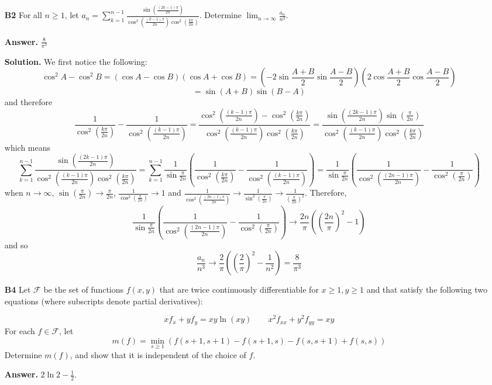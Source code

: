 \documentclass[11pt,a4paper]{article}
\newcommand{\<}{\langle}
\renewcommand{\>}{\rangle}
\begin{document}
\begin{enumerate}
	
	
	\item [\textbf{B2}] For all $n\ge 1$, let $a_n=\sum_{k=1}^{n-1}\frac{\sin(\frac{(2k-1)\pi}{2n})}{\cos^2(\frac{(k-1)\pi}{2n})\cos^2(\frac{k\pi}{2n})}$. Determine $\lim_{n\rightarrow \infty}\frac{a_n}{n^3}$.
	
	\textbf{Answer.} $\frac{8}{\pi^3}$
	
	\textbf{Solution.} We first notice the following: 
	\[
	\cos^2 A - \cos^2B = (\cos A-\cos B)(\cos A+\cos B)=(-2\sin\frac{A+B}{2}\sin\frac{A-B}{2})(2\cos\frac{A+B}{2}\cos\frac{A-B}{2})
	\]
	\[
	=\sin(A+B)\sin(B-A)
	\]
	and therefore 
	\[
	\frac{1}{\cos^2(\frac{k\pi}{2n})}-\frac{1}{\cos^2(\frac{(k-1)\pi}{2n})}
	=\frac{\cos^2(\frac{(k-1)\pi}{2n})-\cos^2(\frac{k\pi}{2n})}{\cos^2(\frac{(k-1)\pi}{2n})\cos^2(\frac{k\pi}{2n})}
	=\frac{\sin(\frac{(2k-1)\pi}{2n})\sin(\frac{\pi}{2n})}{\cos^2(\frac{(k-1)\pi}{2n})\cos^2(\frac{k\pi}{2n})}
	\]
	which means 
	\[
	\sum_{k=1}^{n-1}\frac{\sin(\frac{(2k-1)\pi}{2n})}{\cos^2(\frac{(k-1)\pi}{2n})\cos^2(\frac{k\pi}{2n})}
	=\sum_{k=1}^{n-1}\frac{1}{\sin\frac{\pi}{2n}}(\frac{1}{\cos^2(\frac{k\pi}{2n})}-\frac{1}{\cos^2(\frac{(k-1)\pi}{2n})})
	=\frac{1}{\sin\frac{\pi}{2n}}(\frac{1}{\cos^2(\frac{(2n-1)\pi}{2n})} - \frac{1}{\cos^2(\frac{\pi}{2n})})
	\]
	when $n\to\infty$, $\sin(\frac{\pi}{2n})\to \frac{\pi}{2n}$, $\frac{1}{\cos^2(\frac{\pi}{2n})}\to 1$ and $\frac{1}{\cos^2(\frac{(2n-1)\pi}{2n})}\to \frac{1}{\sin^2(\frac{\pi}{2n})}\to\frac{1}{(\frac{\pi}{2n})^2}$. Therefore, 
	\[
	\frac{1}{\sin\frac{\pi}{2n}}(\frac{1}{\cos^2(\frac{(2n-1)\pi}{2n})} - \frac{1}{\cos^2(\frac{\pi}{2n})})
	\to \frac{2n}{\pi}((\frac{2n}{\pi})^2-1)
	\]
	and so 
	\[
	\frac{a_n}{n^3}\to \frac{2}{\pi}((\frac{2}{\pi})^2-\frac{1}{n^2})=\frac{8}{\pi^3}
	\]
	
	\item[\textbf{B4}] 
	Let $\mathcal{F}$ be the set of functions $f(x, y)$ that are twice continuously differentiable for $x\ge 1, y\ge 1$  and that satisfy
	the following two equations (where subscripts denote partial derivatives):
	
	\[
	xf_x + yf_y = xy\ln (xy)
	\qquad 
	x^2f_{xx}+y^2f_{yy} = xy
	\]
	For each $f\in\mathcal{F}$, let 
	\[
	m(f) = \min_{s\ge 1} (f(s+1, s+1) - f(s+1, s) - f(s, s+1) + f(s, s))
	\]
	Determine $m(f)$, and show that it is independent of the choice of $f$. 
	
	\textbf{Answer.} $2\ln 2 - \frac 12$. 
	

\end{enumerate}
\end{document}
